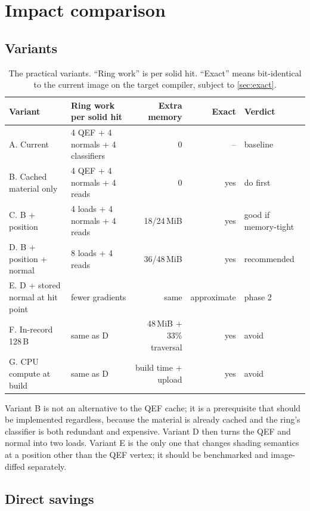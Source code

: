 \documentclass[11pt,a4paper]{article}
\theoremstyle{plain}
\theoremstyle{definition}
\theoremstyle{remark}
\begin{document}
\section{Impact comparison}

\subsection{Variants}

\begin{table}[H]
\centering
\footnotesize
\caption{The practical variants. ``Ring work'' is per solid hit. ``Exact''
means bit-identical to the current image on the target compiler, subject to
\cref{sec:exact}.}
\label{tab:variants}
\begin{tabularx}{\linewidth}{@{}lXrrX@{}}
\toprule
Variant & Ring work per solid hit & Extra memory & Exact & Verdict \\
\midrule
A. Current
  & 4 QEF + 4 normals + 4 classifiers
  & 0 & -- & baseline \\
B. Cached material only
  & 4 QEF + 4 normals + 4 reads
  & 0 & yes & do first \\
C. B + position
  & 4 loads + 4 normals + 4 reads
  & 18/24\,MiB & yes & good if memory-tight \\
D. B + position + normal
  & 8 loads + 4 reads
  & 36/48\,MiB & yes & recommended \\
E. D + stored normal at hit point
  & fewer gradients
  & same & approximate & phase 2 \\
F. In-record 128\,B
  & same as D
  & 48\,MiB + 33\% traversal & yes & avoid \\
G. CPU compute at build
  & same as D
  & build time + upload & yes & avoid \\
\bottomrule
\end{tabularx}
\end{table}

Variant B is not an alternative to the QEF cache; it is a prerequisite that
should be implemented regardless, because the material is already cached and
the ring's classifier is both redundant and expensive. Variant D then turns
the QEF and normal into two loads. Variant E is the only one that changes
shading semantics at a position other than the QEF vertex; it should be
benchmarked and image-diffed separately.

\subsection{Direct savings}
\end{document}
